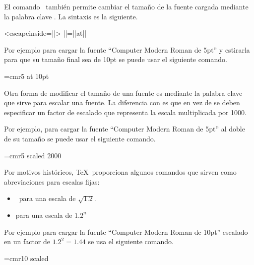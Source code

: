 El comando \texcs\font\ también permite cambiar el tamaño de la fuente cargada mediante la palabra clave . La sintaxis es la siguiente.
\begin{texcode}<escapeinside=||>
  \font||=||at||
\end{texcode}

Por ejemplo para cargar la fuente ``Computer Modern Roman de 5pt'' y estirarla para que su tamaño final sea de 10pt se puede usar el siguiente comando.
\begin{texcode}
  \font\magnifiedfiverm=cmr5 at 10pt
\end{texcode}

Otra forma de modificar el tamaño de una fuente es mediante la palabra clave  que sirve para escalar una fuente. La diferencia con  es que en vez de  se deben especificar un factor de escalado que representa la escala multiplicada por 1000.

Por ejemplo, para cargar la fuente ``Computer Modern Roman de 5pt'' al doble de su tamaño se puede usar el siguiente comando.
\begin{texcode}
  \font\magnifiedfiverm=cmr5 scaled 2000
\end{texcode}

Por motivos históricos, \TeX\ proporciona algunos comandos que sirven como abreviaciones para escalas fijas:
\begin{itemize}
  \item \texcs\magstephalf\ para una escala de $\sqrt{1.2}$.

  \item \texcs\magstep{} para una escala de $1.2^n$
\end{itemize}

Por ejemplo para cargar la fuente ``Computer Modern Roman de 10pt'' escalado en un factor de $1.2^2 = 1.44$ se usa el siguiente comando.
\begin{texcode}
  \font\bigtenrm=cmr10 scaled
\end{texcode}
